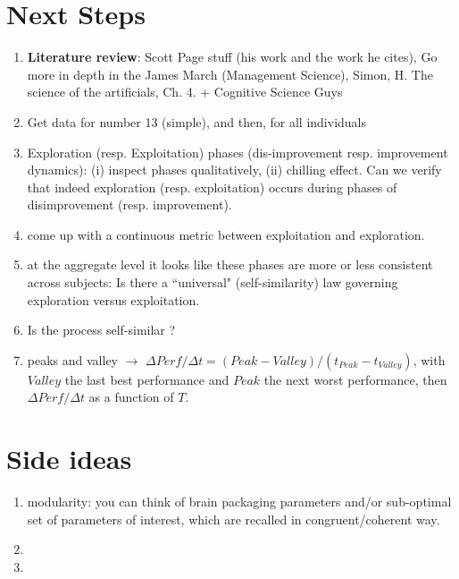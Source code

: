 \section{Next Steps}

\begin{enumerate}
\item {\bf Literature review}: Scott Page stuff (his work and the work he cites), Go more in depth in the James March (Management Science), Simon, H. The science of the artificials, Ch. 4. + Cognitive Science Guys
\item Get data for number 13 (simple), and then, for all individuals
\item Exploration (resp. Exploitation) phases (dis-improvement resp. improvement dynamics): (i) inspect phases qualitatively, (ii) chilling effect. Can we verify that indeed exploration (resp. exploitation) occurs during phases of disimprovement (resp. improvement). 
\item come up with a continuous metric between exploitation and exploration.
\item at the aggregate level it looks like these phases are more or less consistent across subjects: Is there a ``universal" (self-similarity) law governing exploration versus exploitation.
\item Is the process self-similar ?
\item peaks and valley $\rightarrow$ $\Delta Perf / \Delta t = (Peak - Valley)/(t_{Peak} - t_{Valley})$, with $Valley$ the last best performance and $Peak$ the next worst performance, then $\Delta Perf / \Delta t$ as a function of $T$.
\end{enumerate}


\section{Side ideas} 

\begin{enumerate}
\item modularity: you can think of brain packaging parameters and/or sub-optimal set of parameters of interest, which are recalled in congruent/coherent way.
\item 
\item
\end{enumerate}
